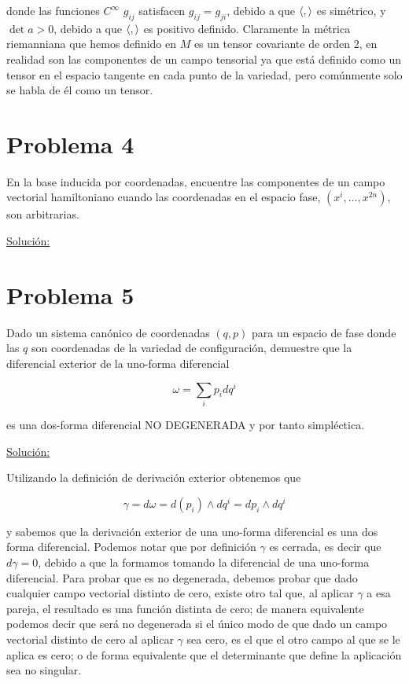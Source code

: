 \documentclass[a4paper,10pt]{article}
\numberwithin{equation}{section}
\begin{document}
donde las funciones $C^\infty$ $g_{ij}$ satisfacen $g_{ij} = g_{ji}$, debido 
a que $\langle \space , \space \rangle$ es simétrico, y $\det{a} > 0$, debido a
que $\langle \space , \space \rangle$ es positivo definido. Claramente la métrica 
riemanniana que hemos definido en $M$ es un tensor covariante de orden 2, en realidad 
son las componentes de un campo tensorial ya que está definido como un tensor 
en el espacio tangente en cada punto de la variedad, pero comúnmente 
solo se habla de él como un tensor.











\section{Problema 4}

En la base inducida por coordenadas, encuentre las componentes de un campo vectorial 
hamiltoniano cuando las coordenadas en el espacio fase, $(x^i,\dots,x^{2n})$, son 
arbitrarias.

\vspace{.3cm}

\underline{Solución:} \vspace{.3cm}

\section{Problema 5}

Dado un sistema canónico de coordenadas $(q,p)$ para un espacio de fase donde las $q$ 
son coordenadas de la variedad de configuración, demuestre que la diferencial exterior 
de la uno-forma diferencial 

$$
\omega = \sum_i p_idq^i
$$

es una dos-forma diferencial NO DEGENERADA y por tanto simpléctica.

\vspace{.3cm}

\underline{Solución:} \vspace{.3cm}

Utilizando la definición de derivación exterior obtenemos que 

\begin{equation}
 \gamma = d\omega = d(p_i) \wedge dq^i = dp_i \wedge dq^i
\end{equation}

y sabemos que la derivación exterior de una uno-forma diferencial es una dos forma 
diferencial. Podemos notar que por definición $\gamma$ es cerrada, es decir que 
$d\gamma = 0$, debido a que la formamos tomando la diferencial de una uno-forma 
diferencial. Para probar que es no degenerada, debemos probar que dado cualquier 
campo vectorial distinto de cero, existe otro tal que, al aplicar $\gamma$ a esa pareja, 
el resultado es una función distinta de cero; de manera equivalente podemos decir 
que será no degenerada si el único modo de que dado un campo vectorial distinto de 
cero al aplicar $\gamma$ sea cero, es el que el otro campo al que se le aplica 
es cero; o de forma equivalente que el determinante que define la aplicación 
sea no singular. 
\end{document}

